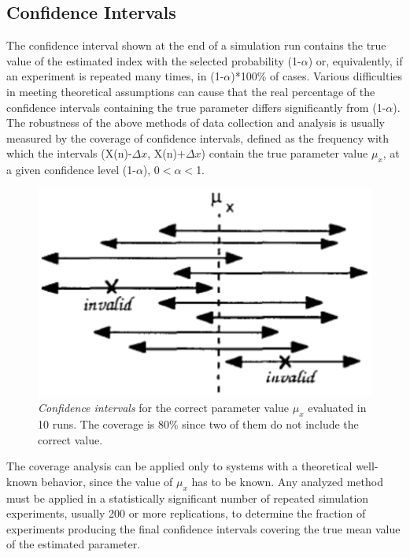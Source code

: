 \subsection{Confidence Intervals}
\label{conint} The confidence interval shown at the end of a
simulation run contains the true value of the estimated index with
the selected probability (1-$\alpha$) or, equivalently, if an
experiment is repeated many times, in (1-$\alpha$)*100\% of cases.
Various difficulties in meeting theoretical assumptions can cause
that the real percentage of the confidence intervals containing
the true parameter differs significantly from (1-$\alpha$). The
robustness of the above methods of data collection and analysis is
usually measured by the coverage of confidence intervals, defined
as the frequency with which the intervals (X(n)-$\Delta x$,
X(n)+$\Delta x$) contain the true parameter value $\mu_x$, at a
given confidence level (1-$\alpha$), 0$<\alpha<$1.
\begin{figure}[h]
    \begin{center}
        \includegraphics[scale=.5]{img/jsimg/5.6.eps}
    \end{center}
    \caption{\emph{Confidence intervals} for the correct parameter value $\mu_x$ evaluated
    in 10 runs. The coverage is 80\% since two of them do not include
    the correct value.}
    \label{fig:ConfIntexam}
\end{figure}
The coverage analysis can be applied only to systems with a
theoretical well-known behavior, since the value of $\mu_x$ has to
be known. Any analyzed method must be applied in a statistically
significant number of repeated simulation experiments, usually 200
or more replications, to determine the fraction of experiments
producing the final confidence intervals covering the true mean
value of the estimated parameter.

